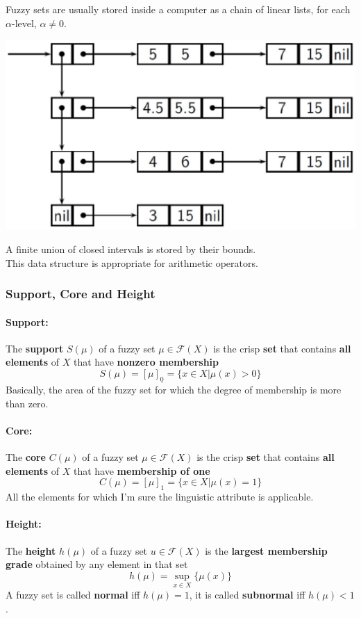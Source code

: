 Fuzzy sets are usually stored inside a computer as a chain of linear lists, for each $\alpha$-level, $\alpha \neq 0$.
\begin{center}
	\includegraphics[width=0.7\columnwidth]{img/FS/hr4}
\end{center}
A finite union of closed intervals is stored by their bounds.\\

This data structure is appropriate for arithmetic operators.\\

\newpage

\subsubsection{Support, Core and Height}

\paragraph{Support:} The \textbf{support} $S(\mu)$ of a fuzzy set $\mu \in \mathcal{F}(X)$ is the crisp \textbf{set} that contains \textbf{all elements} of $X$ that have \textbf{nonzero membership} 
$$ S(\mu) = [\mu]_{\underline{0}} = \{x \in X | \mu (x) > 0 \} $$
Basically, the area of the fuzzy set for which the degree of membership is more than zero.\\ \nn

\paragraph{Core:} The \textbf{core} $C(\mu)$ of a fuzzy set $\mu \in \mathcal{F} (X)$ is the crisp \textbf{set} that contains \textbf{all elements} of $X$ that have \textbf{membership of one}
$$ C(\mu) = [\mu]_1 = \{x \in X | \mu(x) = 1 \} $$
All the elements for which I'm sure the linguistic attribute is applicable.\\ \nn

\paragraph{Height:} The \textbf{height} $h(\mu)$ of a fuzzy set $u \in \mathcal{F} (X)$ is the \textbf{largest membership grade} obtained by any element in that set 
$$ h(\mu) = \sup_{x \in X} \{\mu (x)\} $$
A fuzzy set is called \textbf{normal} iff $h (\mu) = 1$, it is called \textbf{subnormal} iff $h(\mu) < 1$.\\

